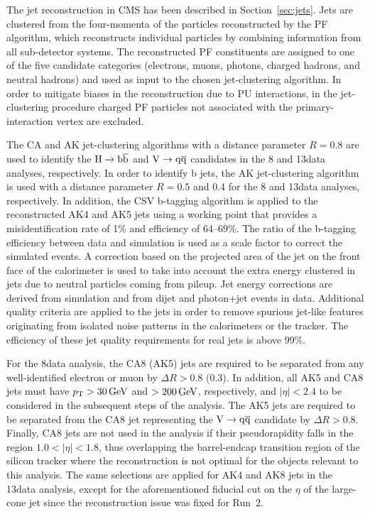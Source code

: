 The jet reconstruction in CMS has been described in Section~\ref{sec:jets}.
Jets are clustered from the four-momenta of the particles reconstructed by the PF algorithm, which reconstructs individual particles by combining information from all sub-detector systems.
The reconstructed PF constituents are assigned to one of the five candidate categories (electrons, muons, photons, charged hadrons, and neutral hadrons) and used as input to the chosen jet-clustering algorithm.
In order to mitigate biases in the reconstruction due to PU interactions, in the jet-clustering procedure charged PF particles not associated with the primary-interaction vertex are excluded.

The CA and AK jet-clustering algorithms with a distance parameter $R = 0.8$ are used to identify the $\mathrm{H}\to{\mathrm{b}\overline{\mathrm{b}}}$ and $\mathrm{V}\to\mathrm{q}\overline{\mathrm{q}}$ candidates in the 8 and 13\TeV data analyses, respectively.
In order to identify b jets, the AK jet-clustering algorithm is used with a distance parameter $R = 0.5$ and 0.4 for the 8 and 13\TeV data analyses, respectively.
In addition, the CSV b-tagging algorithm is applied to the reconstructed AK4 and AK5 jets using a working point that provides a misidentification rate of 1\% and efficiency of 64--69\%.
The ratio of the b-tagging efficiency between data and simulation is used as a scale factor to correct the simulated events.
A correction based on the projected area of the jet on the front face of the calorimeter is used to take into account the extra energy clustered in jets due to neutral particles coming from pileup.
Jet energy corrections are derived from simulation and from dijet and photon+jet events in data.
Additional quality criteria are applied to the jets in order to remove spurious jet-like features originating from isolated noise patterns
in the calorimeters or the tracker. The efficiency of these jet quality requirements for real jets is above 99\%.

For the 8\TeV data analysis, the CA8 (AK5) jets are required to be separated from any well-identified electron or muon by $\Delta R > 0.8$ (0.3).
In addition, all AK5 and CA8 jets must have $p_{\mathrm{T}} > 30\,\text{Ge\hspace{-.08em}V}$ and $> 200\,\text{Ge\hspace{-.08em}V}$, respectively, and $|\eta| < 2.4$ to be considered in the subsequent steps of the analysis.
The AK5 jets are required to be separated from the CA8 jet representing the $\mathrm{V}\to\mathrm{q}\overline{\mathrm{q}}$ candidate by $\Delta R > 0.8$.
Finally, CA8 jets are not used in the analysis if their pseudorapidity falls in the region $1.0 < |\eta| < 1.8$, thus overlapping the barrel-endcap transition region of the silicon tracker where the reconstruction is not optimal for the objects relevant to this analysis. The same selections are applied for AK4 and AK8 jets in the 13\TeV data analysis, except for the aforementioned fiducial cut on the $\eta$ of the large-cone jet since the reconstruction issue was fixed for Run~2.\\


